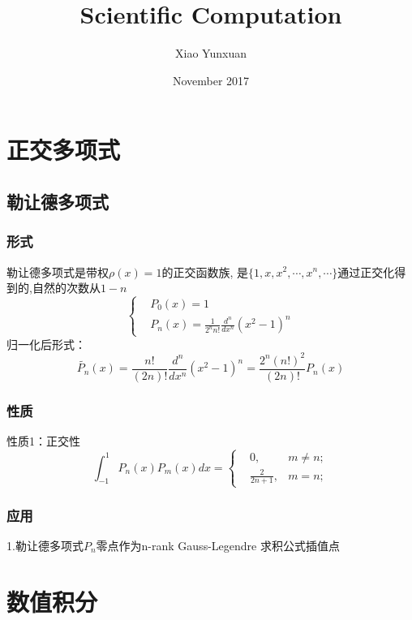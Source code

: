 \documentclass[12pt]{article}
\title{Scientific Computation}
\author{Xiao Yunxuan}
\date{November 2017}
\begin{document}
\begin{CJK*}{UTF8}{gbsn}
\begin{spacing}{1.5}
\maketitle
\newpage

\section{正交多项式}
    \subsection{勒让德多项式}
        \subsubsection{形式}
        勒让德多项式是带权$\rho(x) = 1$的正交函数族,          是$\{1,x,x^2,\cdots,x^n,\cdots \}$通过正交化得到的,自然的次数从$1-n$
        $$
        \left\{
            \begin{aligned}
               &P_0(x) = 1\\
               &P_n(x) = \frac{1}{2^n n!}\frac{d^n}{dx^n}(x^2 - 1)^n
            \end{aligned}
        \right.
        $$  
        归一化后形式：\\
        $$\widetilde{P_n}(x) = \frac{n!}{(2n)!}\frac{d^n}{dx^n}(x^2 - 1)^n = \frac{2^n(n!)^2}{(2n)!}P_n(x)$$
        \subsubsection{性质}
        性质1：正交性
        $$
        \int_{-1}^{1} P_n(x)P_m(x)dx =  
        \left \{
            \begin{aligned}
                &0,    &m\not=n; \\
                &\frac{2}{2n+1},  &m=n;
            \end{aligned}
        \right.
        $$
        \subsubsection{应用}
        1.勒让德多项式$P_n$零点作为n-rank Gauss-Legendre 求积公式插值点

\newpage
\section{数值积分}

\end{spacing}
\end{CJK*}
\end{document}
